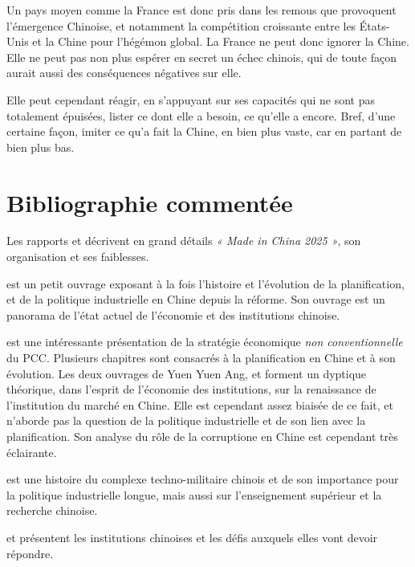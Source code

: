 \documentclass[a4paper]{article}
\begin{document}
Un pays moyen comme la France est donc pris dans les remous que provoquent l’émergence Chinoise, et notamment la compétition croissante entre les États-Unis et la Chine pour l’hégémon global. La France ne peut donc ignorer la Chine. Elle ne peut pas non plus espérer en secret un échec chinois, qui de toute façon aurait aussi des conséquences négatives sur elle.

Elle peut cependant réagir, en s’appuyant sur ses capacités qui ne sont pas totalement épuisées, lister ce dont elle a besoin, ce qu’elle a encore. Bref, d’une certaine façon, imiter ce qu’a fait la Chine, en bien plus vaste, car en partant de bien plus bas.


\section{Bibliographie commentée}
\label{sec:orgc4508dc}

Les rapports \cite{Made_In_China_2025} et \cite{Evolving_MiC25} décrivent en grand détails \textit{« Made in China 2025 »}, son organisation et ses faiblesses.

\cite{naughton21_rise} est un petit ouvrage exposant à la fois l’histoire et l’évolution de la planification, et de la politique industrielle en Chine depuis la réforme. Son ouvrage \cite{naughton18_chines} est un panorama de l’état actuel de l’économie et des institutions chinoise.

\cite{heilmann18_red} est une intéressante présentation de la stratégie économique \textit{non conventionnelle} du PCC. Plusieurs chapitres sont consacrés à la planification en Chine et à son évolution. Les deux ouvrages de Yuen Yuen Ang, \cite{ang20_chinas} et \cite{ang16_how_china} forment un dyptique théorique, dans l’esprit de l’économie des institutions, sur la renaissance de l’institution du marché en Chine. Elle est cependant assez biaisée de ce fait, et n’aborde pas la question de la politique industrielle et de son lien avec la planification. Son analyse du rôle de la corruptione en Chine est cependant très éclairante. 

\cite{feigenbaum03_chinas} est une histoire du complexe techno-militaire chinois et de son importance pour la politique industrielle longue, mais aussi sur l’enseignement supérieur et la recherche chinoise.

\cite{heilmann17_chinas,dickson16} et \cite{cabestan18_demain_chine} présentent les institutions chinoises et les défis auxquels elles vont devoir répondre. 
\end{document}
